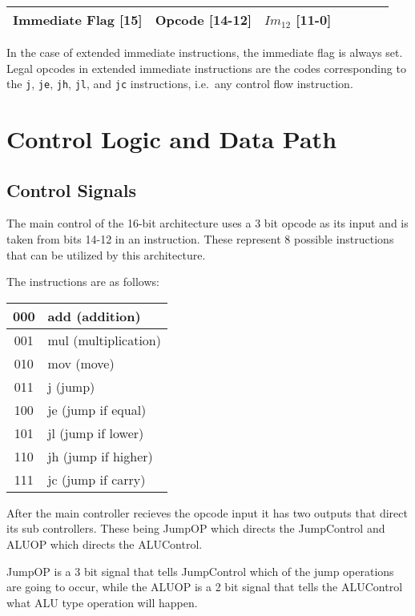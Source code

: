 \documentclass{article}
\begin{document}
\begin{center}
\begin{tabular}{|c|c|c|c|c|c|c|}
\hline
Immediate Flag [15] & Opcode [14-12] & $Im_{12}$ [11-0] \\ \hline
\end{tabular}
\end{center}

In the case of extended immediate instructions, the immediate flag is always
set. Legal opcodes in extended immediate instructions are the codes
corresponding to the \texttt{j}, \texttt{je}, \texttt{jh}, \texttt{jl}, and
\texttt{jc} instructions, i.e.\ any control flow instruction.

\section{Control Logic and Data Path}
\subsection{Control Signals}
The main control of the 16-bit architecture uses a 3 bit opcode as its input and
is taken from bits 14-12 in an instruction.  These represent 8 possible
instructions that can be utilized by this architecture.

The instructions are as follows:

\begin{center}
\begin{tabular}{|c|l|}
\hline
000 & add (addition) \\ \hline
001 & mul (multiplication) \\ \hline
010 & mov (move) \\ \hline
011 & j (jump) \\ \hline
100 & je (jump if equal) \\ \hline
101 & jl (jump if lower) \\ \hline
110 & jh (jump if higher) \\ \hline
111 & jc (jump if carry) \\ \hline
\end{tabular}
\end{center}

After the main controller recieves the opcode input it has two outputs that
direct its sub controllers.  These being JumpOP which directs the JumpControl
and ALUOP which directs the ALUControl.

JumpOP is a 3 bit signal that tells JumpControl which of the jump operations are
going to occur, while the ALUOP is a 2 bit signal that tells the ALUControl what
ALU type operation will happen.
\end{document}
